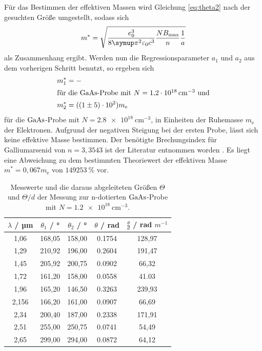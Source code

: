 Für das Bestimmen der effektiven Massen wird Gleichung \ref{eq:theta2} nach der gesuchten Größe umgestellt, sodass sich
\begin{equation}
m^{*} = \sqrt{\frac{e_0^3}{8\pii^2 \varepsilon_0 c^3} \frac{N B_\text{max}}{n} \frac{1}{a}}
\end{equation}
als Zusammenhang ergibt. Werden nun die Regressionsparameter $a_1$ und $a_2$ aus dem vorherigen Schritt benutzt, so ergeben sich
\begin{align*}
  m_1^{*} &= -\\
  \shortintertext{für die $\ce{GaAs}$-Probe mit $N=\SI{1.2e18}{\centi\meter^{-3}}$ und}
  m_2^{*} &= (\num{1 \pm 5e2})m_\text{e}
\end{align*}
für die $\ce{GaAs}$-Probe mit $N=\SI{2.8e18}{\centi\meter^{-3}}$, in Einheiten der Ruhemasse $m_\text{e}$ der Elektronen.
Aufgrund der negativen Steigung bei der ersten Probe, lässt sich keine effektive Masse bestimmen.
Der benötigte Brechungsindex für Galliumarsenid von $n=3,3543$ ist der Literatur entnommen worden \cite{Brechungsindex}.
Es liegt eine Abweichung zu dem bestimmten Theoriewert der effektiven Masse $m^{*}=0,067m_\text{e}$ \cite{effmasse} von $\SI{149253}{\%}$ vor.
\begin{table}[h]
  \centering
  \caption{Messwerte und die daraus abgeleiteten Größen $\Theta$ und $\Theta/d$ der Messung zur n-dotierten $\ce{GaAs}$-Probe mit $N=\SI{1.2e18}{\centi\meter^{-3}}$.}
  \label{tab:probe1}
  \begin{tabular}{S[table-format=1.1] S S S S}
    {$\lambda$ / µm} & {$\theta_1$ / °} & {$\theta_2$ / °} & {$\theta$ / rad} & {$\frac{\theta}{d}$ / rad $m^{-1}$}\\
    ,06 &  168,05 &  158,00 & 0.1754 & 128,97\\
    1,29 &  210,92 &  196,00 & 0.2604 & 191,47\\
    1,45 &  205,92 &  200,75 & 0.0902 & 66,32\\
    1,72 &  161,20 &  158,00 & 0.0558 & 41.03\\
    1,96 &  165,20 &  146,50 & 0.3263 & 239,93\\
    2,156 & 166,20 &  161,00 & 0.0907 & 66,69\\
    2,34 & 200,40 &  187,00 & 0.2338 & 171,91\\
    2,51 & 255,00 &  250,75 & 0.0741 & 54,49\\
    2,65 & 299,00 &  294,00 & 0.0872 & 64,12\\
  \end{tabular}
\end{table}

